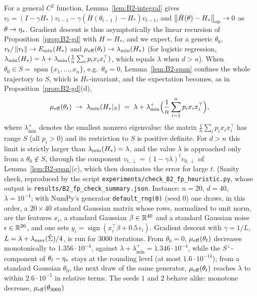\begin{remark}\label{rem:B2-gd-heuristic}
For a general $C^2$ function, Lemma~\ref{lem:B2-integral} gives
$v_t=(I-\gamma H_\ast)v_{t-1}-\gamma(\bar H(\theta_{t-1})-H_\ast)v_{t-1}$, and
$\left\|\bar H(\theta)-H_\ast\right\|_{\mathrm{op}}\to0$ as $\theta\to\eta_\ast$. Gradient descent is thus asymptotically
the linear recursion of Proposition~\ref{prop:B2-gd} with $H=H_\ast$, and we expect, for a generic $\theta_0$,
$v_t/\left\|v_t\right\|\to E_{\min}(H_\ast)$ and $\mu_{\mathrm{eff}}(\theta_t)\to\lambda_{\min}(H_\ast)$ (for logistic regression,
$\lambda_{\min}(H_\ast)=\lambda+\lambda_{\min}(\frac1n\sum_ip_ix_ix_i^\top)$, which equals $\lambda$ when $d>n$). When
$\theta_0\in S=\operatorname{span}\{x_1,\dots,x_n\}$, e.g.\ $\theta_0=0$, Lemma~\ref{lem:B2-span} confines the whole
trajectory to $S$, which is $H_\ast$-invariant, and the expectation becomes, as in Proposition~\ref{prop:B2-gd}(d),
\[
\mu_{\mathrm{eff}}(\theta_t)\;\to\;\lambda_{\min}(H_\ast|_S)\;=\;\lambda+\lambda^+_{\min}\Big(\frac1n\sum_{i=1}^np_ix_ix_i^\top\Big),
\]
where $\lambda^+_{\min}$ denotes the smallest nonzero eigenvalue: the matrix $\frac1n\sum_ip_ix_ix_i^\top$ has range $S$
(all $p_i>0$) and its restriction to $S$ is positive definite. For $d>n$ this limit is strictly larger than
$\lambda_{\min}(H_\ast)=\lambda$, and the value $\lambda$ is approached only from a $\theta_0\notin S$, through the component
$v_{t,\perp}=(1-\gamma\lambda)^tv_{0,\perp}$ of Lemma~\ref{lem:B2-span}(c), which then dominates the error for large $t$.
(Sanity check, reproduced by the script \texttt{experiments/check\_B2\_fp\_heuristic.py}, whose output is
\texttt{results/B2\_fp\_check\_summary.json}. Instance: $n=20$, $d=40$, $\lambda=10^{-4}$; with NumPy's generator
\texttt{default\_rng(0)} (seed $0$) one draws, in this order, a $20\times40$ standard Gaussian matrix whose rows,
normalized to unit norm, are the features $x_i$, a standard Gaussian $\beta\in\mathbb{R}^{40}$ and a standard Gaussian noise
$\epsilon\in\mathbb{R}^{20}$, and one sets $y_i=\operatorname{sign}(x_i^\top\beta+0.5\,\epsilon_i)$. Gradient descent with
$\gamma=1/L$, $L=\lambda+\lambda_{\max}(\hat\Sigma)/4$, is run for $3000$ iterations. From $\theta_0=0$, $\mu_{\mathrm{eff}}(\theta_t)$
decreases monotonically to $1.356\cdot10^{-4}$, against $\lambda+\lambda^+_{\min}=1.346\cdot10^{-4}$, while the
$S^\perp$-component of $\theta_t-\eta_\ast$ stays at the rounding level (at most $1.6\cdot10^{-14}$); from a standard
Gaussian $\theta_0$, the next draw of the same generator, $\mu_{\mathrm{eff}}(\theta_t)$ reaches $\lambda$ to within
$2.6\cdot10^{-5}$ in relative terms. The seeds $1$ and $2$ behave alike: monotone decrease, $\mu_{\mathrm{eff}}(\theta_{3000})$

\end{remark}

